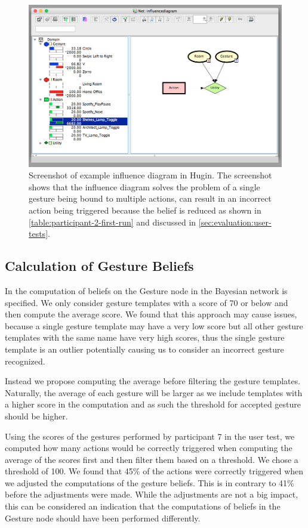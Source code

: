 \begin{figure}[h]
\centering
\includegraphics[width=\textwidth]{images/hugin-influence-diagram}
\caption{Screenshot of example influence diagram in Hugin. The screenshot shows that the influence diagram solves the problem of a single gesture being bound to multiple actions, can result in an incorrect action being triggered because the belief is reduced as shown in \cref{table:participant-2-first-run} and discussed in \cref{sec:evaluation:user-tests}.}
\label{fig:evaluation:alternative-models:hugin-influence-diagram}
\end{figure}

\subsection{Calculation of Gesture Beliefs}

In  the computation of beliefs on the Gesture node in the Bayesian network is specified. We only consider gesture templates with a score of 70 or below and then compute the average score. We found that this approach may cause issues, because a single gesture template may have a very low score but all other gesture templates with the same name have very high scores, thus the single gesture template is an outlier potentially causing us to consider an incorrect gesture recognized.

Instead we propose computing the average before filtering the gesture templates. Naturally, the average of each gesture will be larger as we include templates with a higher score in the computation and as such the threshold for accepted gesture should be higher.

Using the scores of the gestures performed by participant 7 in the user test, we computed how many actions would be correctly triggered when computing the average of the scores first and then filter them based on a threshold. We chose a threshold of 100. We found that 45\% of the actions were correctly triggered when we adjusted the computations of the gesture beliefs. This is in contrary to 41\% before the adjustments were made. While the adjustments are not a big impact, this can be considered an indication that the computations of beliefs in the Gesture node should have been performed differently.

